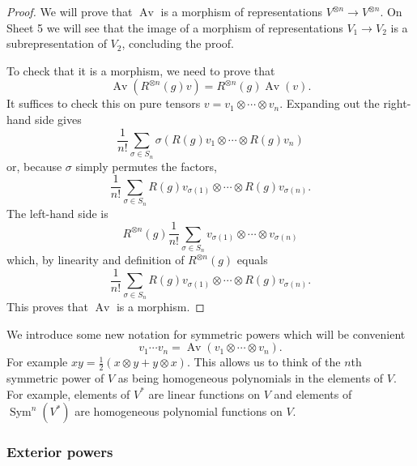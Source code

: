 \documentclass[12pt]{article}
\newcommand{\OP}{\operatorname}
\theoremstyle{definition}
\theoremstyle{check}
\theoremstyle{remark}
\theoremstyle{TheoremNum}
\begin{document}
\begin{proof}
We will prove that $\OP{Av}$ is a morphism of representations $V^{\otimes n}\to V^{\otimes n}$. On Sheet 5 we will see that the image of a morphism of representations $V_1\to V_2$ is a subrepresentation of $V_2$, concluding the proof.

To check that it is a morphism, we need to prove that
\[\OP{Av}(R^{\otimes n}(g)v)=R^{\otimes n}(g)\OP{Av}(v).\]
It suffices to check this on pure tensors $v=v_1\otimes\cdots\otimes v_n$. Expanding out the right-hand side gives
\[\frac{1}{n!}\sum_{\sigma\in S_n}\sigma(R(g)v_1\otimes\cdots\otimes R(g)v_n)\]
or, because $\sigma$ simply permutes the factors,
\[\frac{1}{n!}\sum_{\sigma\in S_n}R(g)v_{\sigma(1)}\otimes\cdots\otimes R(g)v_{\sigma(n)}.\]
The left-hand side is
\[R^{\otimes n}(g)\frac{1}{n!}\sum_{\sigma\in S_n}v_{\sigma(1)}\otimes\cdots\otimes v_{\sigma(n)}\]
which, by linearity and definition of $R^{\otimes n}(g)$ equals
\[\frac{1}{n!}\sum_{\sigma\in S_n}R(g)v_{\sigma(1)}\otimes\cdots\otimes R(g)v_{\sigma(n)}.\]
This proves that $\OP{Av}$ is a morphism.
\end{proof}

We introduce some new notation for symmetric powers which will be convenient
\[v_1\cdots v_n=\OP{Av}(v_1\otimes\cdots\otimes v_n).\]
For example $xy=\frac{1}{2}(x\otimes y+y\otimes x)$. This allows us to think of the $n$th symmetric power of $V$ as being homogeneous polynomials in the elements of $V$. For example, elements of $V^*$ are linear functions on $V$ and elements of $\OP{Sym}^n(V^*)$ are homogeneous polynomial functions on $V$.

\subsubsection{Exterior powers}
\end{document}

